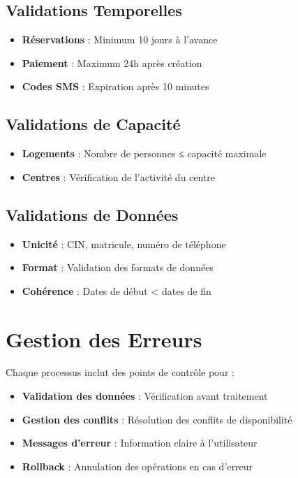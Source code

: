 \documentclass[12pt,a4paper]{article}
\begin{document}
\subsection{Validations Temporelles}
\begin{itemize}
    \item \textbf{Réservations} : Minimum 10 jours à l'avance
    \item \textbf{Paiement} : Maximum 24h après création
    \item \textbf{Codes SMS} : Expiration après 10 minutes
\end{itemize}

\subsection{Validations de Capacité}
\begin{itemize}
    \item \textbf{Logements} : Nombre de personnes ≤ capacité maximale
    \item \textbf{Centres} : Vérification de l'activité du centre
\end{itemize}

\subsection{Validations de Données}
\begin{itemize}
    \item \textbf{Unicité} : CIN, matricule, numéro de téléphone
    \item \textbf{Format} : Validation des formats de données
    \item \textbf{Cohérence} : Dates de début < dates de fin
\end{itemize}

\section{Gestion des Erreurs}

Chaque processus inclut des points de contrôle pour :
\begin{itemize}
    \item \textbf{Validation des données} : Vérification avant traitement
    \item \textbf{Gestion des conflits} : Résolution des conflits de disponibilité
    \item \textbf{Messages d'erreur} : Information claire à l'utilisateur
    \item \textbf{Rollback} : Annulation des opérations en cas d'erreur
\end{itemize}
\end{document}

